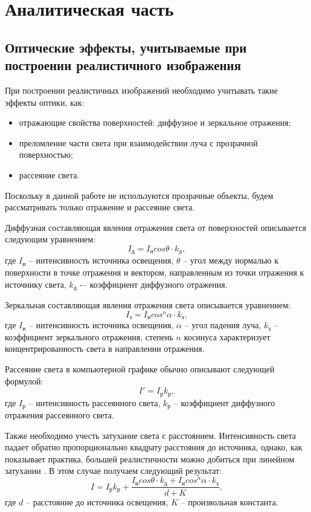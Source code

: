 \chapter{Аналитическая часть}
\section{Оптические эффекты, учитываемые при построении реалистичного изображения}
При построении реалистичных изображений необходимо учитывать такие эффекты оптики, как:
\begin{itemize}
	\item отражающие свойства поверхностей: диффузное и зеркальное отражения;
	\item преломление части света при взаимодействии луча с прозрачной поверхностью;
	\item рассеяние света.
\end{itemize}

Поскольку в данной работе не используются прозрачные объекты, будем рассматривать только отражение и рассеяние света.

Диффузная составляющая явления отражения света от поверхностей описывается следующим уравнением:
\begin{equation}
	I_\text{д} = I_\text{и} cos\theta \cdot k_\text{д}, 
\end{equation}
где $I_\text{и}$ -- интенсивность источника освещения, $\theta$ – угол между нормалью к поверхности в точке отражения и вектором, направленным из точки отражения к источнику света, $k_\text{д}$ -– коэффициент диффузного отражения.

Зеркальная составляющая явления отражения света описывается уравнением:
\begin{equation}
	I_\text{з} = I_\text{и} cos^n\alpha \cdot k_\text{з}, 
\end{equation}
где $I_\text{и}$ -- интенсивность источника освещения, $\alpha$ -- угол падения луча, $k_\text{з}$ -- коэффициент зеркального отражения, степень $n$ косинуса характеризует концентрированность света в направлении отражения.

Рассеяние света в компьютерной графике обычно описывают следующей формулой:
\begin{equation}
	I' = I_\text{р}k_\text{р}, 
\end{equation}
где $I_\text{р}$ -- интенсивность рассеянного света, $k_\text{р}$ -- коэффициент диффузного отражения рассеянного света.

Также необходимо учесть затухание света с расстоянием. Интенсивность света падает обратно пропорционально квадрату расстояния до источника, однако, как показывает практика, большей реалистичности можно добиться при линейном затухании \cite{lit1}. В этом случае получаем следующий результат:
\begin{equation}
	I = I_\text{р}k_\text{р} + \frac{I_\text{и} cos\theta \cdot k_\text{д} + I_\text{и} cos^n\alpha \cdot k_\text{з}}{d + K}, 
\end{equation}
где $d$ -- расстояние до источника освещения, $K$ -- произвольная константа.

